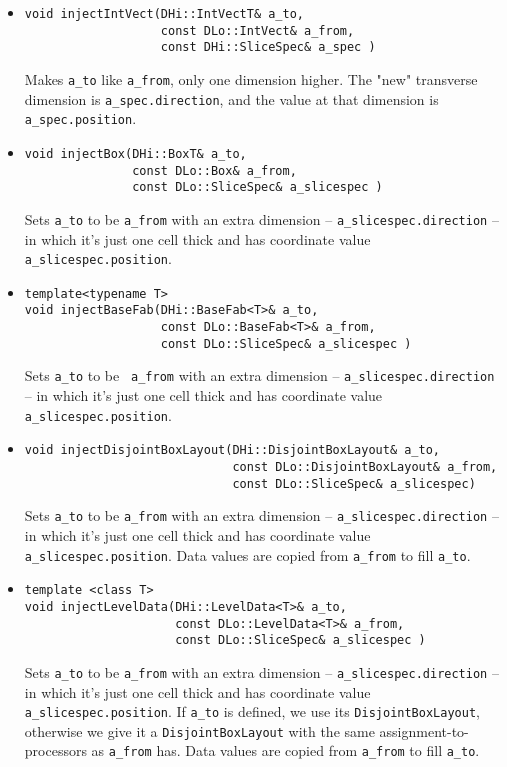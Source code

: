 \begin{itemize}
\item
\begin{verbatim}
void injectIntVect(DHi::IntVectT& a_to,
                   const DLo::IntVect& a_from,
                   const DHi::SliceSpec& a_spec )
\end{verbatim}
Makes \verb/a_to/ like \verb/a_from/, only one dimension higher.  The
"new" transverse dimension is \verb/a_spec.direction/, and the value
at that dimension is \verb/a_spec.position/.

\item
\begin{verbatim}
void injectBox(DHi::BoxT& a_to,
               const DLo::Box& a_from,
               const DLo::SliceSpec& a_slicespec )
\end{verbatim}
Sets \verb/a_to/ to be \verb/a_from/ with an extra dimension --
\verb/a_slicespec.direction/ -- in which it's just one cell thick and
has coordinate value \verb/a_slicespec.position/.
    
\item
\begin{verbatim}
template<typename T> 
void injectBaseFab(DHi::BaseFab<T>& a_to,
                   const DLo::BaseFab<T>& a_from,
                   const DLo::SliceSpec& a_slicespec )
\end{verbatim}
Sets \verb/a_to/ to be \verb/ a_from/ with an extra dimension --
\verb/a_slicespec.direction/ -- in which it's just one cell thick and
has coordinate value \verb/a_slicespec.position/. 

\item
\begin{verbatim}
void injectDisjointBoxLayout(DHi::DisjointBoxLayout& a_to,
                             const DLo::DisjointBoxLayout& a_from,
                             const DLo::SliceSpec& a_slicespec)
\end{verbatim}
Sets \verb/a_to/ to be \verb/a_from/ with an extra dimension --
\verb/a_slicespec.direction/ -- in which it's just one cell thick and
has coordinate value \verb/a_slicespec.position/. Data values are copied
from \verb/a_from/ to fill \verb/a_to/.

\item
\begin{verbatim}
template <class T>
void injectLevelData(DHi::LevelData<T>& a_to,
                     const DLo::LevelData<T>& a_from,
                     const DLo::SliceSpec& a_slicespec )
\end{verbatim}
Sets \verb/a_to/ to be \verb/a_from/ with an extra dimension --
\verb/a_slicespec.direction/ -- in which it's just one cell thick and
has coordinate value \verb/a_slicespec.position/.
If \verb/a_to/ is defined, we use its {\tt DisjointBoxLayout},
otherwise we give it a {\tt DisjointBoxLayout} with the same
assignment-to-processors as \verb/a_from/ has. Data values are copied
from \verb/a_from/ to fill \verb/a_to/.


\end{itemize}
